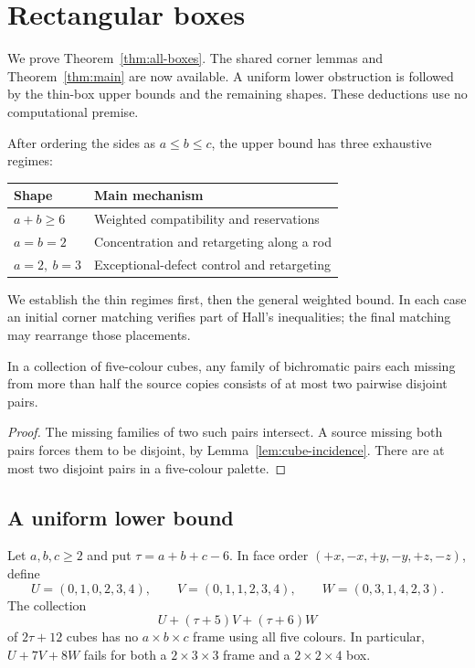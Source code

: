 \section{Rectangular boxes}\label{sec:boxes}
We prove Theorem~\ref{thm:all-boxes}. The shared corner lemmas and Theorem~\ref{thm:main} are now available.
A uniform lower obstruction is followed by the thin-box upper bounds and
the remaining shapes. These deductions use no computational premise.

After ordering the sides as $a\le b\le c$, the upper bound has three
exhaustive regimes:
\begin{center}
\begin{tabular}{ll}
\toprule
Shape & Main mechanism\\
\midrule
$a+b\ge6$ & Weighted compatibility and reservations\\
$a=b=2$ & Concentration and retargeting along a rod\\
$a=2,\ b=3$ & Exceptional-defect control and retargeting\\
\bottomrule
\end{tabular}
\end{center}
We establish the thin regimes first, then the general weighted bound.
In each case an initial corner matching verifies part of Hall's inequalities;
the final matching may rearrange those placements.

\begin{lemma}\label{lem:rare-pairs}
In a collection of five-colour cubes, any family of bichromatic pairs each
missing from more than half the source copies consists of at most two
pairwise disjoint pairs.
\end{lemma}
\begin{proof}
The missing families of two such pairs intersect. A source missing both
pairs forces them to be disjoint, by Lemma~\ref{lem:cube-incidence}.
There are at most two disjoint pairs in a five-colour palette.
\end{proof}

\subsection{A uniform lower bound}

\begin{lemma}\label{lem:thin-three-variety-obstruction}
Let $a,b,c\ge2$ and put $\tau=a+b+c-6$. In face order
$(+x,-x,+y,-y,+z,-z)$, define
\[
 U=(0,1,0,2,3,4),\qquad
 V=(0,1,1,2,3,4),\qquad
 W=(0,3,1,4,2,3).
\]
The collection
\[
 U+(\tau+5)V+(\tau+6)W
\]
of $2\tau+12$ cubes has no $a\times b\times c$ frame using all five
colours. In particular, $U+7V+8W$ fails for both a $2\times3\times3$
frame and a $2\times2\times4$ box.
\end{lemma}

